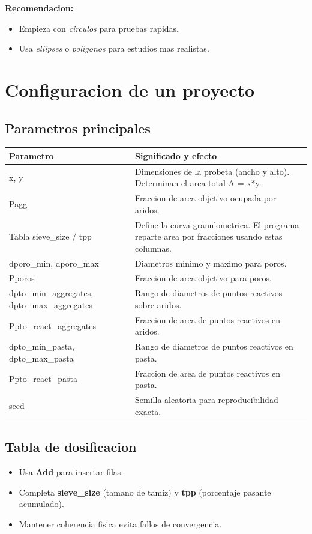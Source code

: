 \documentclass[11pt,a4paper]{article}
\begin{document}
\textbf{Recomendacion:}
\begin{itemize}[leftmargin=1.5em]
  \item Empieza con \textit{circulos} para pruebas rapidas.
  \item Usa \textit{ellipses} o \textit{poligonos} para estudios mas realistas.
\end{itemize}

\section{Configuracion de un proyecto}
\subsection{Parametros principales}
\begin{longtable}{p{} p{}}
\toprule
\textbf{Parametro} & \textbf{Significado y efecto} \\
\midrule
x, y & Dimensiones de la probeta (ancho y alto). Determinan el area total A = x*y. \\
Pagg & Fraccion de area objetivo ocupada por aridos. \\
Tabla sieve\_size / tpp & Define la curva granulometrica. El programa reparte area por fracciones usando estas columnas. \\
dporo\_min, dporo\_max & Diametros minimo y maximo para poros. \\
Pporos & Fraccion de area objetivo para poros. \\
dpto\_min\_aggregates, dpto\_max\_aggregates & Rango de diametros de puntos reactivos sobre aridos. \\
Ppto\_react\_aggregates & Fraccion de area de puntos reactivos en aridos. \\
dpto\_min\_pasta, dpto\_max\_pasta & Rango de diametros de puntos reactivos en pasta. \\
Ppto\_react\_pasta & Fraccion de area de puntos reactivos en pasta. \\
seed & Semilla aleatoria para reproducibilidad exacta. \\
\bottomrule
\end{longtable}

\subsection{Tabla de dosificacion}
\begin{itemize}[leftmargin=1.5em]
  \item Usa \textbf{Add} para insertar filas.
  \item Completa \textbf{sieve\_size} (tamano de tamiz) y \textbf{tpp} (porcentaje pasante acumulado).
  \item Mantener coherencia fisica evita fallos de convergencia.
\end{itemize}
\end{document}
